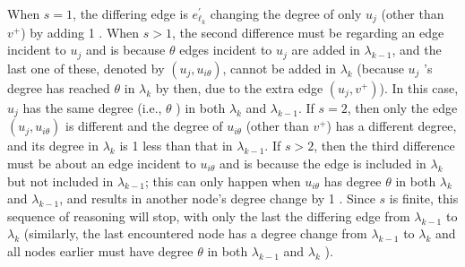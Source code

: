 When $s=1$, the differing edge is $e_{\ell_k}^{\prime}$ changing the degree of only $u_j$ (other than $v^{+}$) by adding 1 . When $s>1$, the second difference must be regarding an edge incident to $u_j$ and is because $\theta$ edges incident to $u_j$ are added in $\lambda_{k-1}$, and the last one of these, denoted by $\left(u_j, u_{i \theta}\right)$, cannot be added in $\lambda_k$ (because $u_j$ 's degree has reached $\theta$ in $\lambda_k$ by then, due to the extra edge $\left(u_j, v^{+}\right)$). In this case, $u_j$ has the same degree (i.e., $\theta$ ) in both $\lambda_k$ and $\lambda_{k-1}$. If $s=2$, then only the edge $\left(u_j, u_{i \theta}\right)$ is different and the degree of $u_{i \theta}$ (other than $v^{+}$) has a different degree, and its degree in $\lambda_k$ is 1 less than that in $\lambda_{k-1}$. If $s>2$, then the third difference must be about an edge incident to $u_{i \theta}$ and is because the edge is included in $\lambda_k$ but not included in $\lambda_{k-1}$; this can only happen when $u_{i \theta}$ has degree $\theta$ in both $\lambda_k$ and $\lambda_{k-1}$, and results in another node's degree change by 1 . Since $s$ is finite, this sequence of reasoning will stop, with only the last the differing edge from $\lambda_{k-1}$ to $\lambda_k$ (similarly, the last encountered node has a degree change from $\lambda_{k-1}$ to $\lambda_k$ and all nodes earlier must have degree $\theta$ in both $\lambda_{k-1}$ and $\lambda_k$ ).